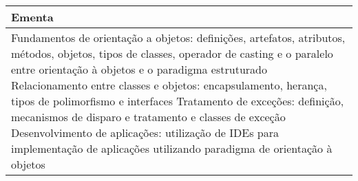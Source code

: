 \begin{quadro}[ht!]
\begin{tabular}{|p{3cm} p{2cm} p{3cm} p{2cm} p{3cm} p{2cm}|}
\multicolumn{6}{|p{15cm}|}{\cellcolor{blue1} Ementa} \\\hline
\hline\multicolumn{6}{|p{15cm}|}{\scriptsize Fundamentos de orientação a objetos: definições, artefatos, atributos, métodos, objetos, tipos de classes, operador de casting e o paralelo entre orientação à objetos e o paradigma estruturado Relacionamento entre classes e objetos: encapsulamento, herança, tipos de polimorfismo e interfaces Tratamento de exceções: definição, mecanismos de disparo e tratamento e classes de exceção Desenvolvimento de aplicações: utilização de IDEs para implementação de aplicações utilizando paradigma de orientação à objetos}\\\hline 
\hline
	\end{tabular}
\end{quadro}


